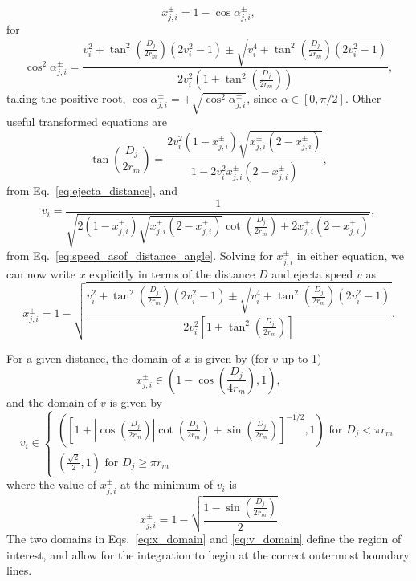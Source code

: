 \documentclass{hitec}
\begin{document}
\begin{equation}
x_{j,i}^{\pm} = 1 - \cos\alpha_{j,i}^{\pm},
\end{equation}
for
\begin{equation}
\cos^2\alpha_{j,i}^{\pm} = \frac{v_i^2+\tan^2\left(\frac{D_j}{2r_m}\right)(2v_i^2-1) \pm \sqrt{v_i^4 + \tan^2\left(\frac{D_j}{2r_m}\right)(2v_i^2-1)}}{2v_i^2\left(1 + \tan^2\left(\frac{D_j}{2r_m}\right)\right) },
\end{equation}
taking the positive root, $\cos\alpha_{j,i}^{\pm} = +\sqrt{\cos^2\alpha_{j,i}^{\pm}}$, since $\alpha\in [0, \pi/2]$. Other useful transformed equations are
\begin{equation}
\tan\left(\frac{D_j}{2r_m}\right) = \frac{2v_i^2(1-x_{j,i}^{\pm})\sqrt{x_{j,i}^{\pm}(2-x_{j,i}^{\pm})}}{1-2v_i^2x_{j,i}^{\pm}(2-x_{j,i}^{\pm})},
\end{equation}
from Eq.\ \eqref{eq:ejecta_distance}, and
\begin{equation}
v_i = \frac{1}{\sqrt{2(1-x_{j,i}^{\pm})\sqrt{x_{j,i}^{\pm}(2-x_{j,i}^{\pm})}\cot\left(\frac{D_j}{2r_m}\right) + 2x_{j,i}^{\pm}(2-x_{j,i}^{\pm})}},
\end{equation}
from Eq.\ \eqref{eq:speed_asof_distance_angle}. Solving for $x_{j,i}^{\pm}$ in either equation, we can now write $x$ explicitly in terms of the distance $D$ and ejecta speed $v$ as
\begin{equation}
x_{j,i}^{\pm} = 1 - \sqrt{\frac{v_i^2 + \tan^2\left(\frac{D_j}{2r_m}\right)(2v_i^2-1) \pm \sqrt{v_i^4 + \tan^2\left(\frac{D_j}{2r_m}\right)(2v_i^2-1)}}{2v_i^2\left[1+\tan^2\left(\frac{D_j}{2r_m}\right)\right]}}.
\end{equation}

For a given distance, the domain of $x$ is given by (for $v$ up to 1)
\begin{equation}\label{eq:x_domain} %
x_{j,i}^{\pm} \in \left(1 - \cos\left(\frac{D_j}{4r_m}\right),
1 \right),
\end{equation}
and the domain of $v$ is given by
\begin{equation}\label{eq:v_domain}
v_i \in
\begin{cases}
\left(\left[1 + \left|\cos\left(\frac{D_j}{2r_m}\right)\right|\cot\left(\frac{D_j}{2r_m}\right) + \sin\left(\frac{D_j}{2r_m}\right) \right]^{-1/2}, 1\right) \text{  for $D_j < \pi r_m$}\\
\left(\frac{\sqrt{2}}{2}, 1\right) \text{  for $D_j \ge \pi r_m$}
\end{cases}
\end{equation}
where the value of $x_{j,i}^{\pm}$ at the minimum of $v_i$ is
\begin{equation}
x_{j,i}^{\pm} = 1-\sqrt{\frac{1-\sin\left(\frac{D_j}{2r_m}\right)}{2}}
\end{equation}
The two domains in Eqs.\ \eqref{eq:x_domain} and \eqref{eq:v_domain} define the region of interest, and allow for the integration to begin at the correct outermost boundary lines.
\end{document}
